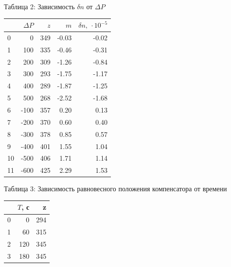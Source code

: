 \documentclass[12pt]{article}
\begin{document}
    \begin{minipage}[t]{0.4\linewidth}
        \centering
        \label{tab:tab2}
        \caption{Таблица 2: Зависимость $\delta n$ от $\Delta P$}
        \begin{tabular}{|l|r|r|r|r|}
            \hline
            & $\Delta P$ & $z$ & $m$   & $\delta n,\ \cdot 10^{-5}$ \\
            \hline
            0  & 0          & 349 & -0.03 & -0.02                      \\
            1  & 100        & 335 & -0.46 & -0.31                      \\
            2  & 200        & 309 & -1.26 & -0.84                      \\
            3  & 300        & 293 & -1.75 & -1.17                      \\
            4  & 400        & 289 & -1.87 & -1.25                      \\
            5  & 500        & 268 & -2.52 & -1.68                      \\
            6  & -100       & 357 & 0.20  & 0.13                       \\
            7  & -200       & 370 & 0.60  & 0.40                       \\
            8  & -300       & 378 & 0.85  & 0.57                       \\
            9  & -400       & 401 & 1.55  & 1.04                       \\
            10 & -500       & 406 & 1.71  & 1.14                       \\
            11 & -600       & 425 & 2.29  & 1.53                       \\
            \hline
        \end{tabular}
    \end{minipage}
    \hfill
    \begin{minipage}[t]{0.3\linewidth}
        \centering
        \caption{Таблица 3: Зависимость равновесного положения компенсатора от времени}
        \label{tab:tab3}
        \begin{tabular}{|l|r|r|}
            \hline
            & $T$, с & z   \\
            \hline
            0 & 0      & 294 \\
            1 & 60     & 315 \\
            2 & 120    & 345 \\
            3 & 180    & 345 \\
            \hline
        \end{tabular}

    \end{minipage}
\end{document}
